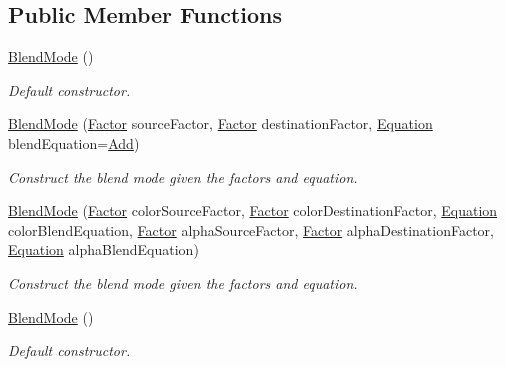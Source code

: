 \subsection*{Public Member Functions}
\begin{DoxyCompactItemize}
\item 
\hyperlink{structsf_1_1_blend_mode_a7faef75eae1fb47bbe93f45f38e3d345}{Blend\-Mode} ()
\begin{DoxyCompactList}\small\item\em Default constructor. \end{DoxyCompactList}\item 
\hyperlink{structsf_1_1_blend_mode_a23c7452cc8e9eb943c3aea6234ce4297}{Blend\-Mode} (\hyperlink{structsf_1_1_blend_mode_afb9852caf356b53bb0de460c58a9ebbb}{Factor} source\-Factor, \hyperlink{structsf_1_1_blend_mode_afb9852caf356b53bb0de460c58a9ebbb}{Factor} destination\-Factor, \hyperlink{structsf_1_1_blend_mode_a7bce470e2e384c4f9c8d9595faef7c32}{Equation} blend\-Equation=\hyperlink{structsf_1_1_blend_mode_a7bce470e2e384c4f9c8d9595faef7c32ada07390f79e829c0eeb83909d3b828dc}{Add})
\begin{DoxyCompactList}\small\item\em Construct the blend mode given the factors and equation. \end{DoxyCompactList}\item 
\hyperlink{structsf_1_1_blend_mode_a69a12c596114e77126616e7e0f7d798b}{Blend\-Mode} (\hyperlink{structsf_1_1_blend_mode_afb9852caf356b53bb0de460c58a9ebbb}{Factor} color\-Source\-Factor, \hyperlink{structsf_1_1_blend_mode_afb9852caf356b53bb0de460c58a9ebbb}{Factor} color\-Destination\-Factor, \hyperlink{structsf_1_1_blend_mode_a7bce470e2e384c4f9c8d9595faef7c32}{Equation} color\-Blend\-Equation, \hyperlink{structsf_1_1_blend_mode_afb9852caf356b53bb0de460c58a9ebbb}{Factor} alpha\-Source\-Factor, \hyperlink{structsf_1_1_blend_mode_afb9852caf356b53bb0de460c58a9ebbb}{Factor} alpha\-Destination\-Factor, \hyperlink{structsf_1_1_blend_mode_a7bce470e2e384c4f9c8d9595faef7c32}{Equation} alpha\-Blend\-Equation)
\begin{DoxyCompactList}\small\item\em Construct the blend mode given the factors and equation. \end{DoxyCompactList}\item 
\hyperlink{structsf_1_1_blend_mode_a7faef75eae1fb47bbe93f45f38e3d345}{Blend\-Mode} ()
\begin{DoxyCompactList}\small\item\em Default constructor. \end{DoxyCompactList}\item 

\end{DoxyCompactItemize}
